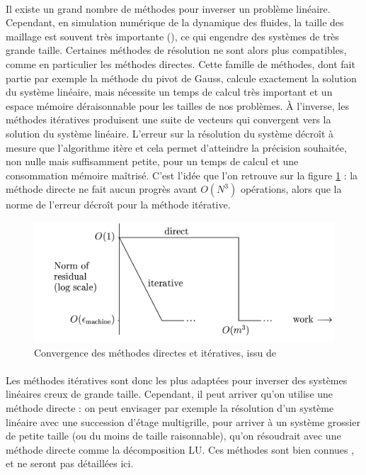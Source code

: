 			\paragraph{}
			Il existe un grand nombre de méthodes pour inverser un problème linéaire.
			Cependant, en simulation numérique de la dynamique des fluides, la taille des maillage est souvent très importante (), ce qui engendre des systèmes de très grande taille.
			Certaines méthodes de résolution ne sont alors plus compatibles, comme en particulier les méthodes directes.
			Cette famille de méthodes, dont fait partie par exemple la méthode du pivot de Gauss, calcule exactement la solution du système linéaire, mais nécessite un temps de calcul très important et un espace mémoire déraisonnable pour les tailles de nos problèmes.
			À l'inverse, les méthodes itératives produisent une suite de vecteurs qui convergent vers la solution du système linéaire.
			L'erreur sur la résolution du système décroît à mesure que l'algorithme itère et cela permet d'atteindre la précision souhaitée, non nulle mais suffisamment petite, pour un temps de calcul et une consommation mémoire maîtrisé.
			C'est l'idée que l'on retrouve sur la figure \ref{fig:direct-iterative} : la méthode directe ne fait aucun progrès avant $O\left(N^3\right)$ opérations, alors que la norme de l'erreur décroît pour la méthode itérative.

			\begin{figure}
				\centering
				\includegraphics[width=.8\textwidth]{images/direct-iterative.png}
				\caption{Convergence des méthodes directes et itératives, issu de \cite{TrefethenBau1997}}
				\label{fig:direct-iterative}
			\end{figure}

			\paragraph{}
			Les méthodes itératives sont donc les plus adaptées pour inverser des systèmes linéaires creux de grande taille.
			Cependant, il peut arriver qu'on utilise une méthode directe : on peut envisager par exemple la résolution d'un système linéaire avec une succession d'étage multigrille, pour arriver à un système grossier de petite taille (ou du moins de taille raisonnable), qu'on résoudrait avec une méthode directe comme la décomposition LU.
			Ces méthodes sont bien connues \cite{TrefethenBau1997}, et ne seront pas détaillées ici.


